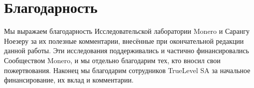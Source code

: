 \documentclass{llncs}
\begin{document}
\section{Благодарность}
Мы выражаем благодарность Исследовательской лаборатории Monero и Сарангу Ноезеру за их полезные комментарии, внесённые при окончательной редакции данной работы. Эти исследования поддерживались и частично финансировались Сообществом Monero, и мы отдельно благодарим тех, кто вносил свои пожертвования. Наконец мы благодарим сотрудников TrueLevel SA за начальное финансирование, их вклад и комментарии.

%
%
\printbibliography
\end{document}
